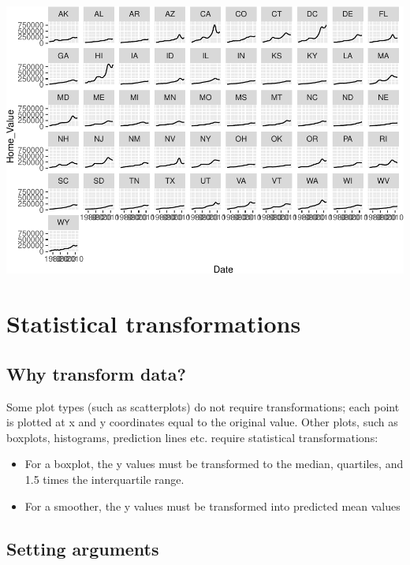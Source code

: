 \documentclass[
]{book}
\providecommand{\tightlist}{%
  \setlength{\itemsep}{0pt}\setlength{\parskip}{0pt}}
\begin{document}
\begin{alert}
\includegraphics{R/Rgraphics/figures/unnamed-chunk-178-1.pdf}

\end{alert}

\hypertarget{statistical-transformations}{%
\section{Statistical transformations}\label{statistical-transformations}}

\hypertarget{why-transform-data}{%
\subsection{Why transform data?}\label{why-transform-data}}

Some plot types (such as scatterplots) do not require transformations; each point is plotted at x and y coordinates equal to the original value. Other plots, such as boxplots, histograms, prediction lines etc. require statistical transformations:

\begin{itemize}
\tightlist
\item
  For a boxplot, the y values must be transformed to the median, quartiles, and 1.5 times the interquartile range.
\item
  For a smoother, the y values must be transformed into predicted mean values
\end{itemize}

\hypertarget{setting-arguments}{%
\subsection{Setting arguments}\label{setting-arguments}}
\end{document}
